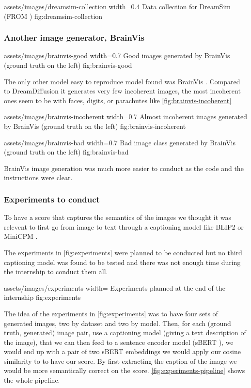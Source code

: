 \insertfigure
    {assets/images/dreamsim-collection}
    {width=0.4\textwidth}
    {Data collection for DreamSim (FROM \cite{dreamsim})}
    {fig:dreamsim-collection}

\subsubsection{Another image generator, BrainVis}

\insertfigure
    {assets/images/brainvis-good}
    {width=0.7\textwidth}
    {Good images generated by BrainVis (ground truth on the left)}
    {fig:brainvis-good}

The only other model easy to reproduce model found was BrainVis \cite{brainvis}.
Compared to DreamDiffusion it generates very few incoherent images, the most
incoherent ones seem to be with faces, digits, or parachutes like
\cref{fig:brainvis-incoherent}

\insertfigure
    {assets/images/brainvis-incoherent}
    {width=0.7\textwidth}
    {Almost incoherent images generated by BrainVis (ground truth on the left)}
    {fig:brainvis-incoherent}

\insertfigure
    {assets/images/brainvis-bad}
    {width=0.7\textwidth}
    {Bad image class generated by BrainVis (ground truth on the left)}
    {fig:brainvis-bad}

BrainVis image generation was much more easier to conduct as the code and the
instructions were clear.

\subsubsection{Experiments to conduct}

To have a score that captures the semantics of the images we thought it was
relevent to first go from image to text through a captioning model like BLIP2
\cite{blip2} or MiniCPM \cite{minicpm}.

The experiments in \cref{fig:experiments} were planned to be conducted but no
third captioning model was found to be tested and there was not enough time
during the internship to conduct them all.

\insertfigure
    {assets/images/experiments}
    {width=\textwidth}
    {Experiments planned at the end of the internship}
    {fig:experiments}

The idea of the experiments in \cref{fig:experiments} was to have four sets of
generated images, two by dataset and two by model. Then, for each (ground truth,
generated) image pair, use a captioning model (giving a text description of the
image), that we can then feed to a sentence encoder model (sBERT \cite{sbert}),
we would end up with a pair of two sBERT embeddings we would apply our cosine
similarity to to have our score. By first extracting the caption of the image we
would be more semantically correct on the score. \cref{fig:experiments-pipeline}
shows the whole pipeline.

